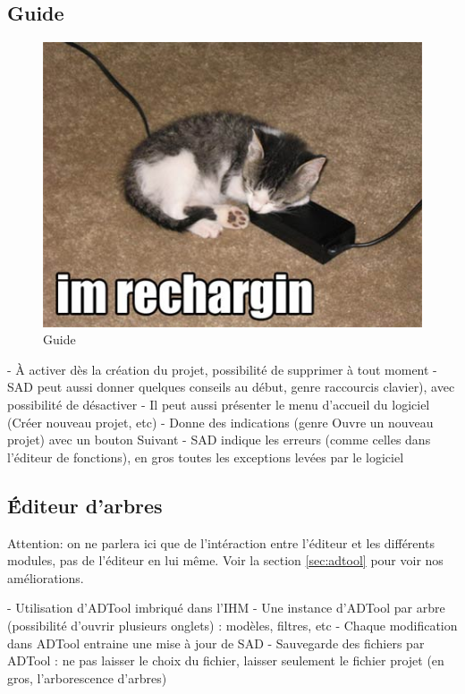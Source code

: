 	\subsection{Guide}
		\begin{figure}
			\begin{center}
				\includegraphics[width=1\textwidth]{figure/guide.jpg}
			\end{center}
			\caption{Guide}
			\label{fig:guide}
		\end{figure}

	- À activer dès la création du projet, possibilité de supprimer à tout moment 
	- SAD peut aussi donner quelques conseils au début, genre raccourcis clavier), avec possibilité de désactiver
	- Il peut aussi présenter le menu d'accueil du logiciel (Créer nouveau projet, etc)
	- Donne des indications (genre Ouvre un nouveau projet) avec un bouton Suivant
	- SAD indique les erreurs (comme celles dans l'éditeur de fonctions), en gros toutes les exceptions levées par le logiciel

	\subsection{\'Éditeur d'arbres}
		Attention: on ne parlera ici que de l'intéraction entre l'éditeur et les différents modules, pas de l'éditeur en lui même.
		Voir la section \ref{sec:adtool} pour voir nos améliorations.

		- Utilisation d'ADTool imbriqué dans l'IHM
		- Une instance d'ADTool par arbre (possibilité d'ouvrir plusieurs onglets) : modèles, filtres, etc
		- Chaque modification dans ADTool entraine une mise à jour de SAD
		- Sauvegarde des fichiers par ADTool : ne pas laisser le choix du fichier, laisser seulement le fichier projet (en gros, l'arborescence d'arbres)